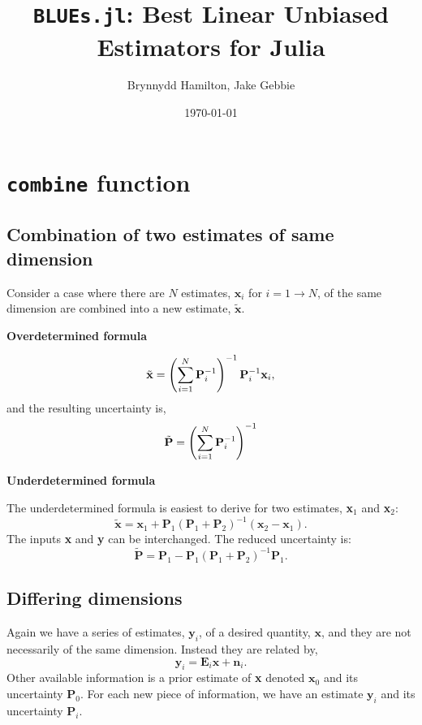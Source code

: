 \documentclass{article}
\title{\texttt{BLUEs.jl}: Best Linear Unbiased Estimators for Julia}
\author{Brynnydd Hamilton, Jake Gebbie}
\date{\today}
\begin{document}
\maketitle

\section{\texttt{combine} function}

\subsection{Combination of two estimates of same dimension}
\label{sec:basic-form}

Consider a case where there are $N$ estimates, $\mathbf{x}_i$ for $i = 1 \rightarrow N$, of the same dimension are combined into a new estimate, $\tilde{\mathbf{x}}$.

\textbf{{Overdetermined formula}}

\begin{equation}
\label{eq:18}
\tilde{\mathbf{x}} = \left(\sum_{i=1}^N {\bf P}_i^{-1}\right)^{-1} {\bf P}_i^{-1} {\bf x}_i,
\end{equation}
and the resulting uncertainty is,
\begin{equation}
\label{eq:19}
\tilde{{\bf P}} = \left(\sum_{i=1}^N{\bf P}_i^{-1}\right)^{-1}
\end{equation}

\textbf{{Underdetermined formula}}

The underdetermined formula is easiest to derive for two estimates, \textbf{x}$_1$ and \textbf{x}$_2$:
\begin{equation}
\label{eq:15}
\tilde{\mathbf{x}} = \mathbf{x}_{1} + \mathbf{P}_1 (\mathbf{P}_1 + \mathbf{P}_2 )^{-1} (\mathbf{x}_2 - \mathbf{x}_1) .
\end{equation}
The inputs \textbf{x} and \textbf{y} can be interchanged. The reduced uncertainty is:
\begin{equation}
\label{eq:16}
\tilde{\mathbf{P}} = \mathbf{P}_1 - \mathbf{P}_1 (\mathbf{P}_1 + \mathbf{P}_2 )^{-1} \mathbf{P}_1.
\end{equation}

\subsection{Differing dimensions}
\label{sec:differing-dimensions}

Again we have a series of estimates, $\mathbf{y}_{i}$, of a desired
quantity, $\mathbf{x}$, and they are not necessarily of the same
dimension. Instead they are related by,
\begin{equation}
\label{eq:17}
\mathbf{y}_i = \mathbf{E}_i \mathbf{x} + \mathbf{n}_i.
\end{equation}
Other available information is a prior estimate of \textbf{x} denoted
$\mathbf{x}_0$ and its uncertainty $\mathbf{P}_{0}$. For each new
piece of information, we have an estimate $\mathbf{y}_i$ and its
uncertainty $\mathbf{P}_{i}$.
\end{document}
